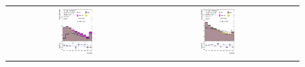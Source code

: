 \documentclass[PAPER, coverpage, atlasdraft=true, texlive=2016, UKenglish]{\ATLASLATEXPATH atlasdoc} %
\providecommand{\DIFaddbeginFL}{} %
\providecommand{\DIFaddendFL}{} %
\providecommand{\DIFdelbeginFL}{} %
\providecommand{\DIFdelendFL}{} %
\begin{document}
%
\begin{figure}[H]
\centering
\begin{tabular}{@{}ccc@{}}
\DIFdelbeginFL %
\DIFdelendFL \DIFaddbeginFL \includegraphics[page=1,width=0.28\textwidth]{figures/new_pt/log_or_nolog/tuH_reg1l2tau1bnj_os_log_.pdf} \DIFaddendFL &
\DIFdelbeginFL %
\DIFdelendFL \DIFaddbeginFL \includegraphics[page=1,width=0.28\textwidth]{figures/new_pt/log_or_nolog/tuH_reg1l1tau1b1j_ss_log_.pdf}\DIFaddendFL &

\end{tabular}
\end{figure}
\end{document}
